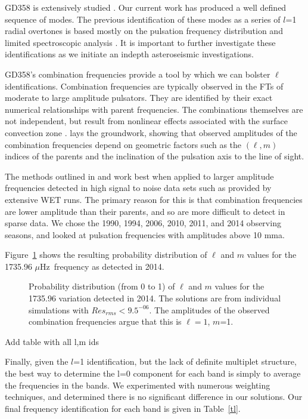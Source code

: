 \documentclass[12pt,preprint]{aastex}
\newcommand{\muHz}{\mbox{$\mu$Hz}}
\begin{document}
GD358 is extensively studied \citep{Montgomery10, Provencal09, Metcalfe00, Winget94}.  Our current 
work has produced a well defined sequence of modes. The previous identification of these modes as 
a series of $l$=1 radial overtones is based mostly on the pulsation frequency distribution 
and limited spectroscopic analysis \citep{Kotak02, Castanheira05}. It is important to further 
investigate these identifications as we initiate an indepth asteroseismic investigations.  

GD358's combination frequencies provide a tool by which we can bolster $\ell$ identifications. 
Combination frequencies are typically observed in the FTs of moderate to large amplitude pulsators.  
They are identified by their exact numerical relationships with parent frequencies.  
The combinations themselves are not independent, but result from nonlinear effects associated 
with the surface convection zone \citep{Brickhill92, Brassard95, Wu01, Ising01}.  
\citet{Wu01} lays the groundwork, showing that observed amplitudes of the combination 
frequencies depend on geometric factors such as the $(\ell,m)$ indices of the parents and the 
inclination of the pulsation axis to the line of sight.  

The methods outlined in \citet{Provencal12} and \citet{Montgomery10} work best when applied to 
larger amplitude frequencies detected in high signal to noise data sets such as provided by 
extensive WET runs.  The primary reason for this is that combination frequencies are lower 
amplitude than their parents, and so are more difficult to detect in sparse data.  We chose 
the 1990, 1994, 2006, 2010, 2011, and 2014 observing seasons, and looked at pulsation 
frequencies with amplitudes above 10 mma.  

Figure~\ref{modeamps} shows the resulting probability distribution of $\ell$ and $m$ values for the 1735.96 \muHz\
frequency as detected in 2014.   

\begin{figure}
 \caption{Probability distribution (from 0 to 1) of $\ell$ and $m$ values for the 1735.96 variation detected in 
 2014.  The solutions are from individual simulations with $Res_{rms}<9.5^{-06}$. The amplitudes of the 
 observed combination frequencies argue that this is $\ell=1$, $m$=1.  
 \label{modeamps}
 }
\end{figure}

Add table with all l,m ids

Finally, given the $l$=1 identification, but the lack of definite multiplet structure, the best way to 
determine the l=0 component for each band is simply to average the frequencies in the bands.  We experimented
with numerous weighting techniques, and determined there is no significant difference in our solutions.  
Our final frequency identification for each band is given in Table~\ref{tl}.  
\end{document}

